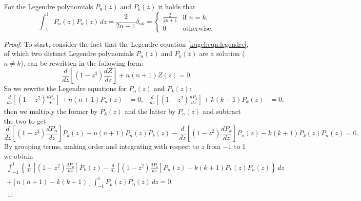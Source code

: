 \begin{lemma} For the Legendre polynomials $P_n(z)$ and $P_k(z)$ it holds that
  \label{kugel:thm:legendre-poly-ortho}
  \begin{equation*}
    \int_{-1}^1 P_n(z) P_k(z) \, dz
    = \frac{2}{2n + 1} \delta_{nk}
    = \begin{cases}
      \frac{2}{2n + 1} & \text{if } n = k, \\
      0 & \text{otherwise}.
    \end{cases}
  \end{equation*}
\end{lemma}
\begin{proof}
  To start, consider the fact that the Legendre equation
  \eqref{kugel:eqn:legendre}, of which two distinct Legendre polynomials
  $P_n(z)$ and $P_k(z)$ are a solution ($n \neq k$), can be rewritten in the
  following form:
  \begin{equation}
    \frac{d}{dz} \left[ 
      \left( 1 - z^2 \right) \frac{dZ}{dz}
    \right] + n(n+1) Z(z) = 0.
  \end{equation}
  So we rewrite the Legendre equations for $P_n(z)$ and $P_k(z)$:
  \begin{align*}
    \frac{d}{dz} \left[ 
      \left( 1 - z^2 \right) \frac{dP_n}{dz}
    \right] + n(n+1) P_n(z) &= 0,
    &
    \frac{d}{dz} \left[ 
      \left( 1 - z^2 \right) \frac{dP_k}{dz}
    \right] + k(k+1) P_k(z) &= 0,
  \end{align*}
  then we multiply the former by $P_k(z)$ and the latter by $P_n(z)$ and
  subtract the two to get
  \begin{equation*}
    \frac{d}{dz} \left[ 
      \left( 1 - z^2 \right) \frac{dP_n}{dz}
    \right] P_k(z) + n(n+1) P_n(z) P_k(z)
    -
    \frac{d}{dz} \left[ 
      \left( 1 - z^2 \right) \frac{dP_k}{dz}
    \right] P_n(z) - k(k+1) P_k(z) P_n(z) = 0.
  \end{equation*}
  By grouping terms, making order and integrating with respect to $z$ from $-1$
  to 1 we obtain
  \begin{gather}
    \int_{-1}^1 \left\{
      \frac{d}{dz} \left[ 
        \left( 1 - z^2 \right) \frac{dP_n}{dz}
      \right] P_k(z) 
      -
      \frac{d}{dz} \left[ 
        \left( 1 - z^2 \right) \frac{dP_k}{dz}
      \right] P_n(z) - k(k+1) P_k(z) P_n(z)
    \right\} \,dz \nonumber \\
    + \left[ n(n+1) - k(k+1) \right] \int_{-1}^1 P_k(z) P_n(z) \, dz = 0.
    \label{kugel:thm:legendre-poly-ortho:proof:1}
  \end{gather}

\end{proof}
